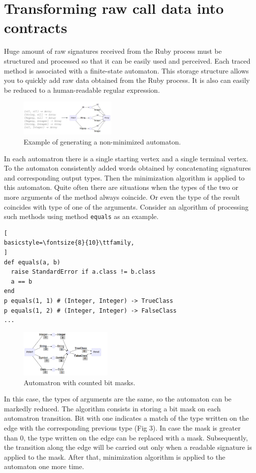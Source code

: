 \documentclass[conference]{IEEEtran}
\begin{document}
\section{Transforming raw call data into contracts}
Huge amount of raw signatures received from the Ruby process must be structured and processed so that it can be easily used and perceived. Each traced method is associated with a finite-state automaton. This storage structure allows you to quickly add raw data obtained from the Ruby process. It is also can easily be reduced to a human-readable regular expression. 
\begin{figure}[h]
    \centering
    \includegraphics[width=0.42\textwidth]{img2}
    \caption{Example of generating a non-minimized automaton.}
\end{figure}
\newpage
In each automatron there is a single starting vertex and a single terminal vertex. To the automaton consistently added words obtained by concatenating signatures and corresponding output types. Then the minimization algorithm\cite{dfa_minimisation} is applied to this automaton. Quite often there are situations when the types of the two or more arguments of the method always coincide. Or even the type of the result coincides with type of one of the arguments. Consider an algorithm of processing such methods using method \texttt{equals} as an example.
\begin{lstlisting}[
basicstyle=\fontsize{8}{10}\ttfamily,
]
def equals(a, b)
  raise StandardError if a.class != b.class
  a == b
end
p equals(1, 1) # (Integer, Integer) -> TrueClass
p equals(1, 2) # (Integer, Integer) -> FalseClass
...
\end{lstlisting}
\begin{figure}[h]
    \centering
    \includegraphics[width=0.4\textwidth]{img4}
    \caption{Automatron with counted bit masks.}
\end{figure}
In this case, the types of arguments are the same, so the automaton can be markedly reduced. The algorithm consists in storing a bit mask on each automatron transition. Bit with one indicates a match of the type written on the edge with the corresponding previous type (Fig 3). In case the mask is greater than 0, the type written on the edge can be replaced with a mask. Subsequently, the transition along the edge will be carried out only when a readable signature is applied to the mask. After that, minimization algorithm is applied to the automaton one more time.
\end{document}
